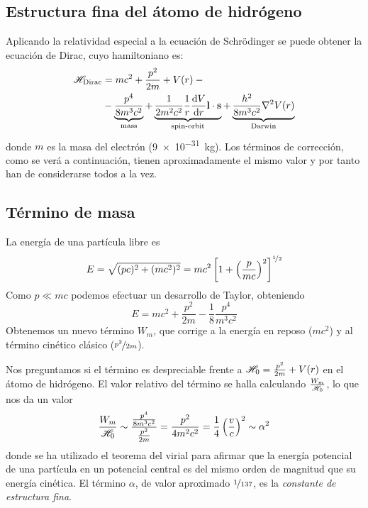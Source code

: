 \subsection{Estructura fina del átomo de hidrógeno}
Aplicando la relatividad especial a la ecuación de Schrödinger se
puede obtener la ecuación de Dirac, cuyo hamiltoniano es:
\begin{equation}
  \begin{split}
     \mathscr{H} _\text{Dirac} &= mc^2 + \frac{p^2}{2m} + V(r) {}-{} \\ &-
    \underbrace{\frac{p^4}{8m^3c^2}}_{\text{mass}} +
    \underbrace{\frac{1}{2m^2c^2}\frac{1}{r}\dv{V}{r}\bm{\mathrm{l}}\cdot
      \bm{\mathrm{s}}}_{\text{spin-orbit}} +
    \underbrace{\frac{h^2}{8m^3c^2}\nabla^2V(r)}_{\text{Darwin}}
  \end{split}
\end{equation}
donde $m$ es la masa del electrón (\SI{9e-31}{\kilo\gram}). Los
términos de corrección, como se verá a continuación, tienen
aproximadamente el mismo valor y por tanto han de considerarse todos a
la vez.

\subsection{Término de masa}
La energía de una partícula libre es
\begin{equation}
  E = \sqrt{(pc)^2 + (mc^2)^2} = mc^2 \left[ 1 + \left( \frac{p}{mc} \right)^2 \right]^{{\nicefrac{1}{2}}}
\end{equation}
Como $p \ll mc$ podemos efectuar un desarrollo de Taylor, obteniendo
\begin{equation}
  E = mc^2 + \frac{p^2}{2m} - \frac{1}{8} \frac{p^4}{m^3c^2}
\end{equation}
Obtenemos un nuevo término $W_m$, que corrige a la energía en reposo
($mc^2$) y al término cinético clásico ($\nicefrac{p^2}{2m}$).

Nos preguntamos si el término es despreciable frente a $ \mathscr{H} _0
= \frac{p^2}{2m} + V(r)$ en el átomo de hidrógeno. El
valor relativo del término se halla calculando
$\frac{W_m}{ \mathscr{H} _0}$, lo que nos da un valor
\begin{equation}
  \frac{W_m}{ \mathscr{H} _0} \sim
  \frac{\frac{p^4}{8m^3c^2}}{\frac{p^2}{2m}} = \frac{p^2}{4m^2c^2} =
  \frac{1}{4} \left( \frac{v}{c} \right)^2 \sim \alpha^2
\end{equation}
donde se ha utilizado el teorema del virial para afirmar que la
energía potencial de una partícula en un potencial central es del mismo orden de
magnitud que su energía cinética. El término $\alpha$, de valor
aproximado $\nicefrac{1}{137}$, es la \emph{constante de estructura fina}.

